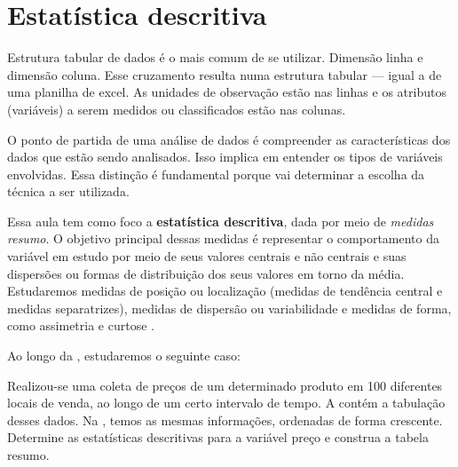 \section{Estatística descritiva}%
\label{sec:estatistica-descritiva}

%
%

Estrutura tabular de dados é o mais comum de se utilizar. Dimensão linha e
dimensão coluna. Esse cruzamento resulta numa estrutura tabular --- igual a de
uma planilha de excel. As unidades de observação estão nas linhas e os
atributos (variáveis) a serem medidos ou classificados estão nas colunas.

O ponto de partida de uma análise de dados é compreender as características dos
dados que estão sendo analisados. Isso implica em entender os tipos de
variáveis envolvidas. Essa distinção é fundamental porque vai determinar a
escolha da técnica a ser utilizada.

Essa aula tem como foco a \textbf{estatística descritiva}, dada por meio de
\emph{medidas resumo}. O objetivo principal dessas medidas é representar o
comportamento da variável em estudo por meio de seus valores centrais e não
centrais e suas dispersões ou formas de distribuição dos seus valores em torno
da média.
Estudaremos medidas de posição ou localização (medidas de tendência central e
medidas separatrizes), medidas de dispersão ou variabilidade e medidas de
forma, como assimetria e curtose \parencite[p.~112]{favero}.

Ao longo da , estudaremos o seguinte caso:

\begin{case}
    Realizou-se uma coleta de preços de um determinado produto em 100
    diferentes locais de venda, ao longo de um certo intervalo de tempo. A
     contém a tabulação desses dados. Na
    , temos as mesmas informações, ordenadas
    de forma crescente. Determine as estatísticas descritivas para a variável
    preço e construa a tabela resumo.
    \label{eg:coleta-precos}
\end{case}

